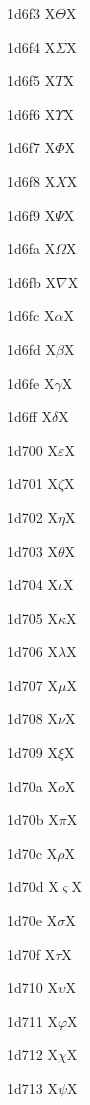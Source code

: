 \documentclass[11pt]{article}
\begin{document}
1d6f3 X{\ensuremath{\mathit{\varTheta}}}X

1d6f4 X{\ensuremath{\mathit{\Sigma}}}X

1d6f5 X{\ensuremath{\mathit{T}}}X

1d6f6 X{\ensuremath{\mathit{\Upsilon}}}X

1d6f7 X{\ensuremath{\mathit{\Phi}}}X

1d6f8 X{\ensuremath{\mathit{X}}}X

1d6f9 X{\ensuremath{\mathit{\Psi}}}X

1d6fa X{\ensuremath{\mathit{\Omega}}}X

1d6fb X{\ensuremath{\mathit{\nabla}}}X

1d6fc X{\ensuremath{\mathit{\alpha}}}X

1d6fd X{\ensuremath{\mathit{\beta}}}X

1d6fe X{\ensuremath{\mathit{\gamma}}}X

1d6ff X{\ensuremath{\mathit{\delta}}}X

1d700 X{\ensuremath{\mathit{\varepsilon}}}X

1d701 X{\ensuremath{\mathit{\zeta}}}X

1d702 X{\ensuremath{\mathit{\eta}}}X

1d703 X{\ensuremath{\mathit{\theta}}}X

1d704 X{\ensuremath{\mathit{\iota}}}X

1d705 X{\ensuremath{\mathit{\kappa}}}X

1d706 X{\ensuremath{\mathit{\lambda}}}X

1d707 X{\ensuremath{\mathit{\mu}}}X

1d708 X{\ensuremath{\mathit{\nu}}}X

1d709 X{\ensuremath{\mathit{\xi}}}X

1d70a X{\ensuremath{\mathit{o}}}X

1d70b X{\ensuremath{\mathit{\pi}}}X

1d70c X{\ensuremath{\mathit{\rho}}}X

1d70d X{\ensuremath{\mathit{\varsigma}}}X

1d70e X{\ensuremath{\mathit{\sigma}}}X

1d70f X{\ensuremath{\mathit{\tau}}}X

1d710 X{\ensuremath{\mathit{\upsilon}}}X

1d711 X{\ensuremath{\mathit{\varphi}}}X

1d712 X{\ensuremath{\mathit{\chi}}}X

1d713 X{\ensuremath{\mathit{\psi}}}X
\end{document}
